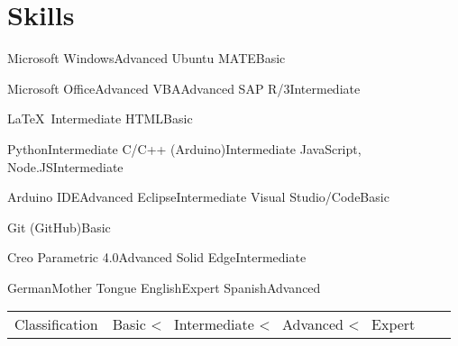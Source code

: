 
\section*{Skills}
\medskip





	{Microsoft Windows}{Advanced}
	{Ubuntu MATE}{Basic}
	{}{}
	{}{}



%
	{Microsoft Office}{Advanced}
	{VBA}{Advanced}
	{SAP R/3}{Intermediate}
	{}{}
	

%
	{\LaTeX\ }{Intermediate}
	{HTML}{Basic}
	{}{}
	{}{}
	

%
	{Python}{Intermediate}	
	{C/C++ (Arduino)}{Intermediate}
	{JavaScript, Node.JS}{Intermediate}
	{}{}



	{Arduino IDE}{Advanced}	
	{Eclipse}{Intermediate}
	{Visual Studio/Code}{Basic}
	{}{}


	{Git (GitHub)}{Basic}
	{}{}
	{}{}
	{}{}
	
	
	{Creo Parametric 4.0}{Advanced}
	{Solid Edge}{Intermediate}
	{}{}
	{}{}


	{German}{Mother Tongue}
	{English}{Expert}
	{Spanish}{Advanced}
	{}{}
	
	
	

\noindent
\begin{tabular*}{\textwidth}{@{}R{6cm}|lll}
	\noindent
	{\small Classification}	&	{\small Basic \textless~ Intermediate \textless~ Advanced \textless~ Expert}
\end{tabular*}
